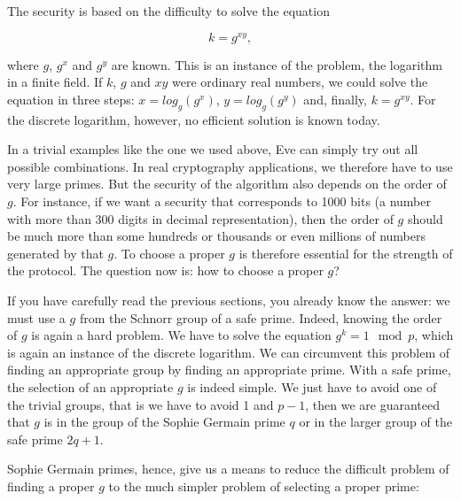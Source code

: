 \documentclass{scrreprt}
\begin{document}
The security is based on the difficulty to solve
the equation 

\begin{equation}
  k = g^{xy},
\end{equation}

where $g$, $g^x$ and $g^y$ are known.
This is an instance of the  problem,
the logarithm in a finite field.
If $k$, $g$ and $xy$ were ordinary real numbers,
we could solve the equation in three steps:
$x = log_g(g^{x})$, $y = log_g(g^{y})$ and, finally,
$k = g^{xy}$.
For the discrete logarithm, however, no efficient solution
is known today.

In a trivial examples like the one we used above,
Eve can simply try out all possible combinations.
In real cryptography applications, we therefore 
have to use very large primes.
But the security of the algorithm also depends on
the order of $g$.
For instance, if we want a security that corresponds
to \num{1000} bits (a number with more than 300 digits
in decimal representation), then the order of $g$ should
be much more than some hundreds or thousands or even millions
of numbers generated by that $g$.
To choose a proper $g$ is therefore essential
for the strength of the protocol.
The question now is: how to choose a proper $g$?

If you have carefully read the previous sections,
you already know the answer:
we must use a $g$ from the Schnorr group of a
safe prime. 
Indeed, knowing the order of $g$ is again
a hard problem. We have to solve the equation
$g^k = 1 \mod p$, which is again an instance
of the discrete logarithm.
We can circumvent this problem
of finding an appropriate group
by finding an appropriate prime. 
With a safe prime, the selection
of an appropriate $g$ is indeed simple.
We just have to avoid one of the trivial groups,
that is we have to avoid 1 and $p-1$, 
then we are guaranteed that $g$ is in 
the group of the Sophie Germain prime $q$
or in the larger group of the safe prime $2q+1$.

Sophie Germain primes, hence,
give us a means to reduce
the difficult problem of finding a proper $g$ to the much
simpler problem of selecting a proper prime:
\end{document}
